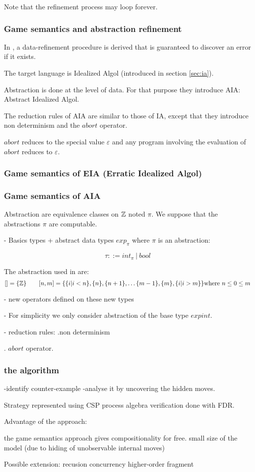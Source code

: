 Note that the refinement process may loop forever.


\subsubsection{Game semantics and abstraction refinement} In
\citep{DBLP:conf/sas/DimovskiGL05}, a data-refinement procedure is
derived that is guaranteed to discover an error if it exists.

The target language is Idealized Algol (introduced in section
\ref{sec:ia}).

Abstraction is done at the level of data. For that purpose they
introduce AIA: Abstract Idealized Algol.

The reduction rules of AIA are similar to those of IA, except that
they introduce non determinism and the $abort$ operator.

$abort$ reduces to the special value $\varepsilon$ and any program
involving the evaluation of $abort$ reduces to $\varepsilon$.


\subsubsection{Game semantics of EIA (Erratic Idealized Algol)} \todo

\subsubsection{Game semantics of AIA} Abstraction are equivalence
classes on $\mathbb{Z}$ noted $\pi$. We suppose that the abstractions
$\pi$ are computable.

- Basics types + abstract data types $exp_\pi$ where $\pi$ is an
abstraction:

$$ \tau ::= int_\pi\ |\ bool$$

The abstraction used in \cite{DBLP:conf/sas/DimovskiGL05} are:
$$ [] = \{ \mathbb{Z} \} \qquad [n,m] = \{ \{ i | i<n \}, \{ n \}, \{n+1\},
\ldots \{ m-1\}, \{ m\}, \{ i | i > m \} \} \mbox{where } n \leq 0
\leq m$$


- new operators defined on these new types

- For simplicity we only consider abstraction of the base type
$expint$.

- reduction rules: .non determinism

. $abort$ operator.


\subsubsection{the algorithm} \todo -identify counter-example
-analyse it by uncovering the hidden moves.

Strategy represented using CSP process algebra verification done
with FDR.



Advantage of the approach:

the game semantics approach gives compositionality for free. small
size of the model (due to hiding of unobservable internal moves)



Possible extension: recusion concurrency higher-order fragment
